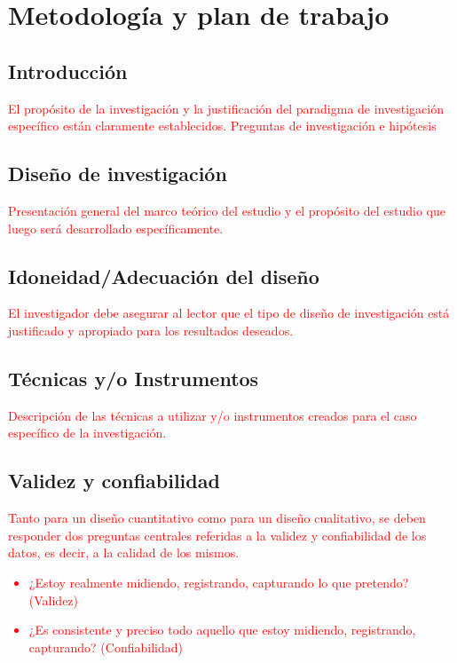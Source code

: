 \chapter{Metodología y plan de trabajo}\label{cap:04}
\thispagestyle{empty}

\section{Introducción}

\textcolor{red}{El propósito de la investigación y la justificación del paradigma de investigación específico
están claramente establecidos. Preguntas de investigación e hipótesis}


\section{Diseño de investigación}

\textcolor{red}{Presentación general del marco teórico del estudio y el propósito del estudio que luego
será desarrollado específicamente.}


\section{Idoneidad/Adecuación del diseño} 
\textcolor{red}{El investigador debe asegurar al lector que el tipo de diseño de investigación está
justificado y apropiado para los resultados deseados.}


\section{Técnicas y/o Instrumentos} 
\textcolor{red}{Descripción de las técnicas a utilizar y/o instrumentos creados para el caso específico
de la investigación.}


\section{Validez y confiabilidad} 
\textcolor{red}{Tanto para un diseño cuantitativo como para un diseño cualitativo, se deben responder dos preguntas 
centrales referidas a la validez y confiabilidad de los datos, es decir, a la calidad de los mismos.
\begin{itemize}
     \item ¿Estoy realmente midiendo, registrando, capturando lo que pretendo? (Validez)
     \item ¿Es consistente y preciso todo aquello que estoy midiendo, registrando, capturando? (Confiabilidad)
\end{itemize}}


